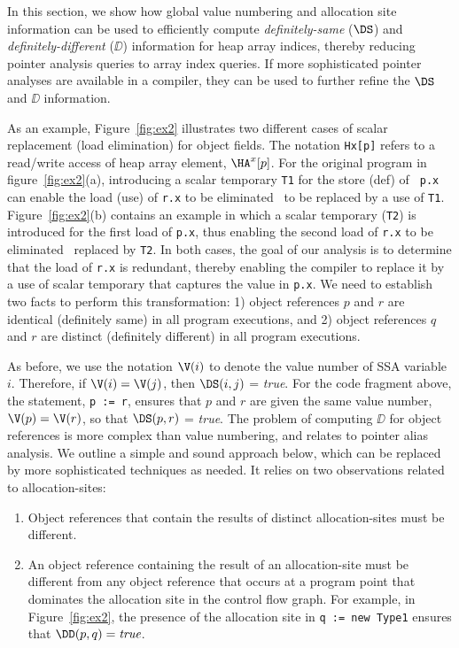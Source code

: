In this section, we show how global value numbering and allocation
site information can be used to efficiently 
compute
{\it definitely-same} ($\DS$) and {\it definitely-different}
($\DD$) information for 
heap array indices, thereby 
reducing pointer analysis queries to array index queries.
If more sophisticated pointer analyses are available in a compiler,
they can be used to further refine the $\DS$ and $\DD$ information.

As an example, 
Figure~\ref{fig:ex2} illustrates two different cases of scalar
replacement (load elimination) for object fields. 
The notation {\tt Hx[p]} refers to a read/write access of heap array
element, 
$\HA^x[p]$.
For the original program in figure~\ref{fig:ex2}(a),
introducing a scalar temporary {\tt T1} for the store (def) of {\tt
p.x} can enable the load (use) of {\tt r.x} to be eliminated \ie\ to
be replaced by a use of {\tt T1}.  Figure~\ref{fig:ex2}(b)
contains an example in which a scalar temporary ({\tt T2}) is
introduced for the first load of {\tt p.x}, thus enabling the second
load of {\tt r.x} to be eliminated \ie\ replaced by {\tt T2}. 
In both cases, the goal of our analysis is to determine that the load
of {\tt r.x} is redundant, thereby enabling
the compiler to replace it by 
a use of scalar temporary that captures the value in {\tt p.x}.
We need to establish two facts to perform this transformation:
1) object references $p$ and $r$ are identical (definitely same) in 
all program executions, and 2)
object references $q$ and $r$ are distinct (definitely different) in
all program executions. 

As before, we use the notation $\V(i)$ to denote the value number of SSA 
variable $i$.  Therefore, if $\V(i) = \V(j)$, then 
$\DS(i,j)$ = {\it true}.  
For the code fragment above, the  statement, {\tt p~:=~r},
ensures that $p$ and $r$ are given the same value number,
$\V(p) = \V(r)$, so that $\DS(p,r)$ = {\it true}.
The problem of
computing $\DD$ for object references is more complex than value numbering, and relates
to pointer alias analysis.  We outline a simple  and sound approach
below, which can be replaced by more sophisticated techniques as needed.
It relies on two observations related to allocation-sites:
\begin{enumerate}
\item Object references that contain the results of distinct allocation-sites
must be different.
\item An object reference containing the result of an allocation-site
must be different from any object reference 
that occurs at a program point that dominates the allocation site in the control flow graph.
For example, in Figure~\ref{fig:ex2},
the presence of the allocation site in {\tt q~:=~new~Type1}
ensures that $\DD(p,q) = \mbox{\it true}$.
\end{enumerate}


